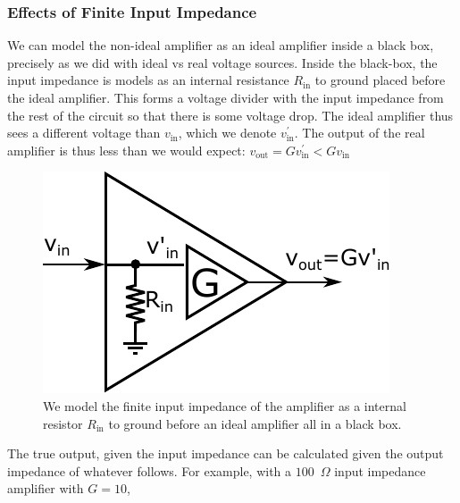 \documentclass[]{article}
\begin{document}
\subsubsection{Effects of Finite Input Impedance}
\label{sec:AMP_effect_input}
We can model the non-ideal amplifier as an ideal amplifier inside a black box, precisely as we did with ideal vs real voltage sources. Inside the black-box, the input impedance is models as an internal resistance $R_\text{in}$ to ground placed before the ideal amplifier. This forms a voltage divider with the input impedance from the rest of the circuit so that there is some voltage drop. The ideal amplifier thus sees a different voltage than $v_\text{in}$, which we denote $v^\prime_\text{in}$. The output of the real amplifier is thus less than we would expect: $v_\text{out} = Gv^\prime_\text{in} < Gv_\text{in}$
\begin{figure}[h]
\caption{We model the finite input impedance of the amplifier as a internal resistor $R_\text{in}$ to ground before an ideal amplifier all in a black box.}
\label{fig:real_amp_int}
\begin{center}
\includegraphics{Images/RealAmplifier_int.pdf}
\end{center}
\end{figure}

The true output, given the input impedance can be calculated given the output impedance of whatever follows. For example, with a $100$~$\Omega$ input impedance amplifier with $G = 10$, 
\end{document}
